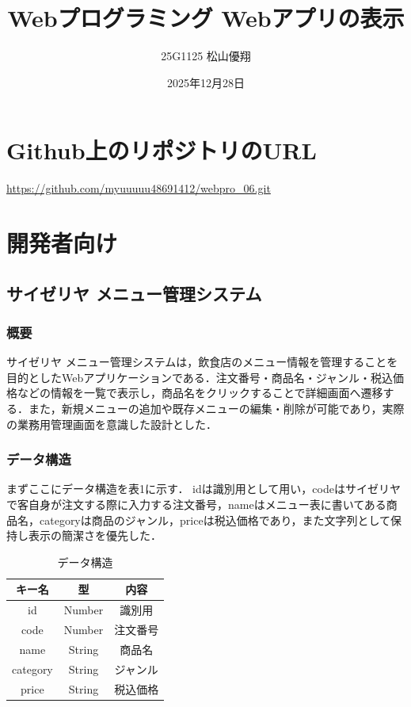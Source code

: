 \documentclass[uplatex,dvipdfmx]{jsarticle}
\begin{document}
\title{Webプログラミング Webアプリの表示}
\author{25G1125 松山優翔}
\date{2025年12月28日}
\maketitle

\section{Github上のリポジトリのURL}
\url{https://github.com/myuuuuu48691412/webpro_06.git}

\section{開発者向け}

\subsection{サイゼリヤ メニュー管理システム}

\subsubsection{概要}
サイゼリヤ メニュー管理システムは，飲食店のメニュー情報を管理することを目的としたWebアプリケーションである．注文番号・商品名・ジャンル・税込価格などの情報を一覧で表示し，商品名をクリックすることで詳細画面へ遷移する．また，新規メニューの追加や既存メニューの編集・削除が可能であり，実際の業務用管理画面を意識した設計とした．

\subsubsection{データ構造}
まずここにデータ構造を表1に示す．
idは識別用として用い，codeはサイゼリヤで客自身が注文する際に入力する注文番号，nameはメニュー表に書いてある商品名，categoryは商品のジャンル，priceは税込価格であり，また文字列として保持し表示の簡潔さを優先した．

\begin{table}[H]
    \centering
    \caption{データ構造}
    \label{tab:pulse_comparison}
    \setlength{\extrarowheight}{3pt} 
    \begin{tabular}{|c|c|c|}
        \hline
        キー名 & 型 & 内容 \\
        \hline
        id & Number & 識別用 \\
        \hline
        code & Number & 注文番号 \\
        \hline
        name & String & 商品名 \\
        \hline
        category & String & ジャンル \\
        \hline
        price & String & 税込価格 \\
        \hline
     \end{tabular}
\end{table}
\end{document}
